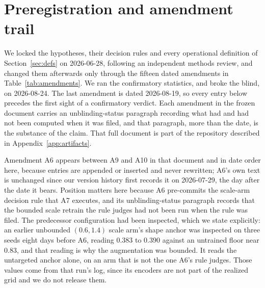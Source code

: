 \documentclass[10pt]{article}
\begin{document}
\section{Preregistration and amendment trail}
\label{app:amendments}
We locked the hypotheses, their decision rules and every operational definition of
Section~\ref{sec:defs} on 2026-06-28, following an independent methods review, and changed them
afterwards only through the fifteen dated amendments in Table~\ref{tab:amendments}. We ran
the confirmatory statistics, and broke the blind, on 2026-08-24. The last amendment is dated
2026-08-19, so every entry below precedes the first sight of a confirmatory verdict. Each amendment
in the frozen document carries an unblinding-status paragraph recording what had and had not been
computed when it was filed, and that paragraph, more than the date, is the substance of the claim.
That full document is part of the repository described in Appendix~\ref{app:artifacts}.

Amendment A6 appears between A9 and A10 in that document and in date order here, because entries are
appended or inserted and never rewritten; A6's
own text is unchanged since our version history first records it on 2026-07-29, the day after the
date it bears. Position matters here because A6 pre-commits the scale-arm decision rule
that A7 executes, and its unblinding-status paragraph records that the bounded scale retrain the
rule judges had not been run when the rule was filed. The
predecessor configuration had been inspected, which we state explicitly: an
earlier unbounded $(0.6, 1.4)$ scale arm's shape anchor was inspected on three seeds eight days
before A6, reading $0.383$ to $0.390$ against an untrained floor near $0.83$, and that reading is
why the augmentation was bounded. It reads the untargeted anchor alone, on an arm that is not the
one A6's rule judges. Those values come from that run's log, since
its encoders are not part of the realized grid and we do
not release them.
\end{document}

